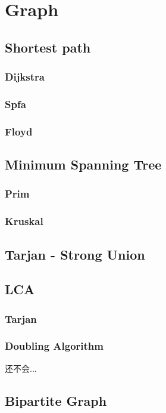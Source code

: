 \section{Graph}
	\subsection{Shortest path}
		\subsubsection{Dijkstra}
			
		\subsubsection{Spfa}
			
		\subsubsection{Floyd}
			
	\subsection{Minimum Spanning Tree}
		\subsubsection{Prim}
			
		\subsubsection{Kruskal}
			
	\subsection{Tarjan - Strong Union}
		
	\subsection{LCA}
		\subsubsection{Tarjan}
			
		\subsubsection{Doubling Algorithm}
			还不会...
	\subsection{Bipartite Graph}
